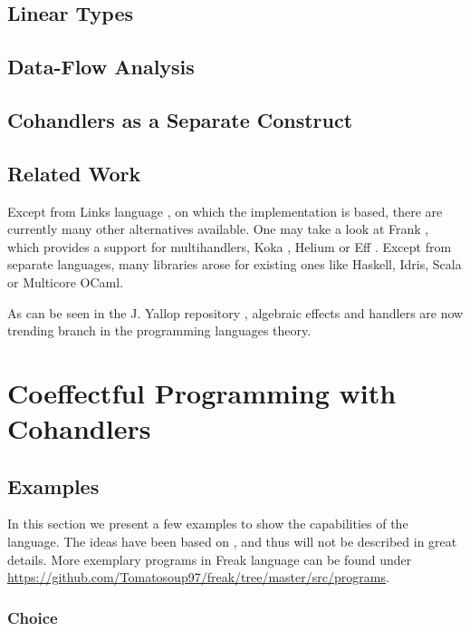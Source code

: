 \documentclass[declaration,shortabstract]{iithesis}
\begin{document}
\section{Linear Types}
\section{Data-Flow Analysis}
\section{Cohandlers as a Separate Construct}
\section{Related Work}

    Except from Links language \cite{handlers-cps}, on which the implementation
    is based, there are currently many other alternatives available. One may take
    a look at Frank \cite{frank}, which provides a support for multihandlers,
    Koka \cite{leijen-koka}, Helium \cite{helium} or Eff \cite{eff}. Except from
    separate languages, many libraries arose for existing ones like Haskell,
    Idris, Scala or Multicore OCaml.

    As can be seen in the J. Yallop repository \cite{effects-bibliography},
    algebraic effects and handlers are now trending branch in the programming languages theory.


\chapter{Coeffectful Programming with Cohandlers}
\section{Examples}
\label{sec:examples}
    In this section we present a few examples to show the capabilities of the
    language. The ideas have been based on \cite{programming-in-eff}, and thus will not be
    described in great details. More exemplary programs in Freak language can
    be found under \\ \href{https://github.com/Tomatosoup97/freak/tree/master/src/programs}{\underline{https://github.com/Tomatosoup97/freak/tree/master/src/programs}}.

    \subsection{Choice}
    \label{sec:choice-example}
\end{document}
